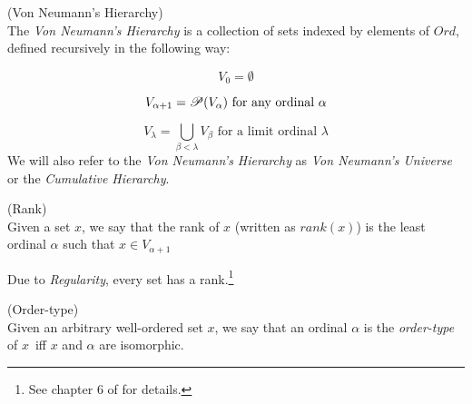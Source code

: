 
\begin{definition}{(Von Neumann's Hierarchy)}\label{def:von_neumann}\\ %
The \emph{Von Neumann's Hierarchy} is a collection of sets indexed by elements of $Ord$, defined recursively in the following way:
\bce[(i)]
\item 
\begin{equation}
V_0 = \emptyset
\end{equation}
\item 
\begin{equation}
V_{\alpha+1} = \mathscr{P} (V_\alpha)\mbox{ for any ordinal $\alpha$}
\end{equation}
\item
\begin{equation} 
V_\lambda = \bigcup_{\beta < \lambda} V_\beta \mbox{ for a limit ordinal $\lambda$}
\end{equation}
\ece
We will also refer to the \emph{Von Neumann's Hierarchy} as \emph{Von Neumann's Universe} or the \emph{Cumulative Hierarchy}. %
\end{definition}

\begin{definition}{(Rank)}\label{def:rank}\\ %
Given a set $x$, we say that the rank of $x$ (written as $rank(x)$) is the least ordinal $\alpha$ such that $x \in V_{\alpha+1}$
\end{definition}
Due to \emph{Regularity}, every set has a rank.\footnote{See chapter 6 of \cite{JechBook} for details.}

\begin{definition}{(Order-type)}\label{def:order_type}\\ %
Given an arbitrary well-ordered set $x$, we say that an ordinal $\alpha$ is the \emph{order-type} of $x$ iff $x$ and $\alpha$ are isomorphic. %
\end{definition}


